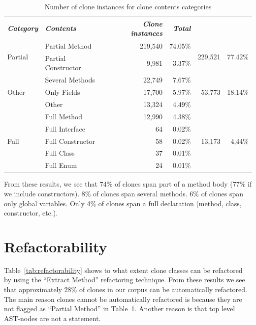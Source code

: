 \begin{table}[H]
\centering
\begin{tabular}{@{}llrrrr@{}}
\toprule
\textit{\textbf{Category}} & \textit{\textbf{Contents}} & \textit{\textbf{Clone instances}} & \textit{\textbf{Total}} \\ \midrule
\multirow{2}{*}{Partial} & Partial Method & 219,540 & 74.05\% & \multirow{2}{*}{229,521}& \multirow{2}{*}{77.42\%} \\ \cmidrule(lr){2-4}
 & Partial Constructor & 9,981 & 3.37\% & & \\ \midrule
\multirow{3}{*}{Other} & Several Methods & 22,749 & 7.67\% & \multirow{3}{*}{53,773} & \multirow{3}{*}{18.14\%} \\ \cmidrule(lr){2-4}
 & Only Fields & 17,700 & 5.97\% & & \\ \cmidrule(lr){2-4}
 & Other & 13,324 & 4.49\% & & \\ \midrule
 \multirow{5}{*}{Full} & Full Method & 12,990 & 4.38\% & \multirow{5}{*}{13,173}& \multirow{5}{*}{4,44\%} \\ \cmidrule(lr){2-4}
  & Full Interface & 64 & 0.02\% & & \\ \cmidrule(lr){2-4}
  & Full Constructor & 58 & 0.02\% & & \\ \cmidrule(lr){2-4}
  & Full Class & 37 & 0.01\% & & \\ \cmidrule(lr){2-4}
  & Full Enum & 24 & 0.01\% & & \\ \bottomrule
\end{tabular}
\caption{Number of clone instances for clone contents categories}
\label{tab:contents}
\end{table}

From these results, we see that 74\% of clones span part of a method body (77\% if we include constructors). 8\% of clones span several methods. 6\% of clones span only global variables. Only 4\% of clones span a full declaration (method, class, constructor, etc.).

\section{Refactorability}
Table~\ref{tab:refactorability} shows to what extent clone classes can be refactored by using the ``Extract Method'' refactoring technique. From these results we see that approximately 28\% of clones in our corpus can be automatically refactored. The main reason clones cannot be automatically refactored is because they are not flagged as ``Partial Method'' in Table~\ref{tab:contents}. Another reason is that top level AST-nodes are not a statement.

